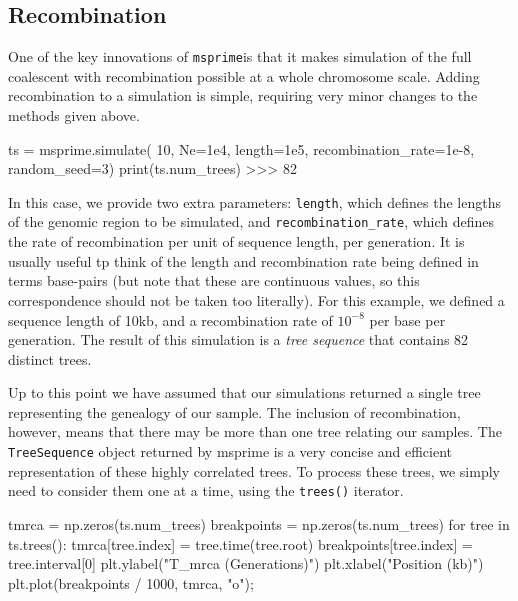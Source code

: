 \documentclass[graybox]{svmult}
\newcommand{\msprime}[0]{\texttt{msprime}}
\newcommand{\includenbimage}[1]{\begin{center}\texttt{[image: \#1]}\end{center}}
\begin{document}
\subsection{Recombination}\label{recombination}

One of the key innovations of \msprime is that it makes simulation of the
full coalescent with recombination possible at a whole chromosome scale.
Adding recombination to a simulation is simple, requiring very minor
changes to the methods given above.

\begin{pythoncode}
ts = msprime.simulate(
    10, Ne=1e4, length=1e5, recombination_rate=1e-8, random_seed=3)
print(ts.num_trees)
>>> 82
\end{pythoncode}

    In this case, we provide two extra parameters: \texttt{length}, which
defines the lengths of the genomic region to be simulated, and
\texttt{recombination\_rate}, which defines the rate of recombination
per unit of sequence length, per generation. It is usually useful tp
think of the length and recombination rate being defined in terms
base-pairs (but note that these are continuous values, so this
correspondence should not be taken too literally). For this example, we
defined a sequence length of 10kb, and a recombination rate of
\(10^{-8}\) per base per generation. The result of this simulation is a
\emph{tree sequence} that contains 82 distinct trees.

Up to this point we have assumed that our simulations returned a single
tree representing the genealogy of our sample. The inclusion of
recombination, however, means that there may be more than one tree
relating our samples. The \texttt{TreeSequence} object returned by
msprime is a very concise and efficient representation of these highly
correlated trees. To process these trees, we simply need to consider
them one at a time, using the \texttt{trees()} iterator.

\begin{pythoncode}
tmrca = np.zeros(ts.num_trees)
breakpoints = np.zeros(ts.num_trees)
for tree in ts.trees():
    tmrca[tree.index] = tree.time(tree.root)
    breakpoints[tree.index] = tree.interval[0]
plt.ylabel("T_mrca (Generations)")
plt.xlabel("Position (kb)")
plt.plot(breakpoints / 1000, tmrca, "o");
\end{pythoncode}

\end{document}
